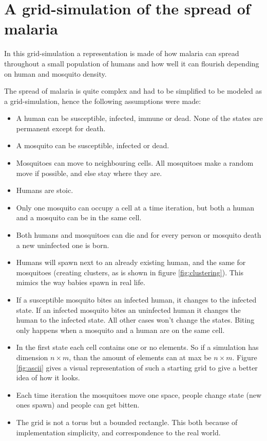 \documentclass[a4paper]{report}
\begin{document}


\chapter{A grid-simulation of the spread of malaria}
\label{cha:malaria}

In this grid-simulation a representation is made of how malaria can spread
throughout a small population of humans and how well it can flourish
depending on human and mosquito density. 

The spread of malaria is quite complex and had to be simplified to be modeled as
a grid-simulation, hence the following assumptions were made:

\begin{itemize}
    \item A human can be susceptible, infected, immune or dead. None of the states are
        permanent except for death.
    \item A mosquito can be susceptible, infected or dead. 
    \item Mosquitoes can move to neighbouring cells. All mosquitoes make a
        random move if possible, and else stay where they are.
    \item Humans are stoic.
    \item Only one mosquito can occupy a cell at a time iteration, but both a
        human and a mosquito can be in the same cell.
    \item Both humans and mosquitoes can die and for every person or
        mosquito death a new uninfected one is born.
    \item Humans will spawn next to an already existing human, and the same for
        mosquitoes (creating clusters, as is shown in figure
        \ref{fig:clustering}). This mimics the way babies spawn in real life.
    \item If a susceptible mosquito bites an infected human, it changes to the
        infected state. If an infected mosquito bites an uninfected human it
        changes the human to the infected state. All other cases won't change
        the states. Biting only happens when a mosquito and a human are on the
        same cell.
    \item In the first state each cell contains one or no elements. So
    if a simulation has dimension $n \times m$, than the amount of elements can
    at max be $n \times m$. Figure \ref{fig:ascii} gives a visual representation of
    such a starting grid to give a better idea of how it looks.
    \item Each time iteration the mosquitoes move one space, people change state
        (new ones spawn)
        and people can get bitten.
    \item The grid is not a torus but a bounded rectangle. This both because of
        implementation simplicity, and correspondence to the real world.
\end{itemize}
\end{document}
